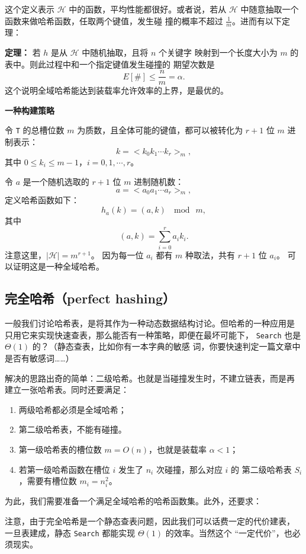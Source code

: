 \documentclass[a4paper]{ctexart}
\theoremstyle{definition}
\theoremstyle{definition}
\begin{document}
这个定义表示 $\mathscr{H}$ 中的函数，平均性能都很好。或者说，若从
$\mathscr{H}$ 中随意抽取一个函数来做哈希函数，任取两个键值，发生碰
撞的概率不超过 $\frac{1}{m}$。进而有以下定理：

{\bf 定理：} 若 $h$ 是从 $\mathscr{H}$ 中随机抽取，且将 $n$ 个关键字
映射到一个长度大小为 $m$ 的表中。则此过程中和一个指定键值发生碰撞的
期望次数是
$$ E[\#] \leq \frac{n}{m} = \alpha.
$$
这个说明全域哈希能达到装载率允许效率的上界，是最优的。

{\bf 一种构建策略}

令 \verb|T| 的总槽位数 $m$ 为质数，且全体可能的键值，都可以被转化为 $r +
1$ 位 $m$ 进制表示：$$ k = <k_0 k_1 \cdots k_r>_m, $$其中 $0 \leq
k_i \leq m - 1$，$i = 0, 1, \cdots, r$。

令 $a$ 是一个随机选取的 $r + 1$ 位 $m$ 进制随机数：
$$
a = <a_0 a_1 \cdots a_r>_m,
$$
定义哈希函数如下：
$$
h_a(k) = (a, k)~\mod~m,
$$
其中
$$
(a, k) = \sum_{i = 0}^r a_i k_i.
$$
注意这里，$|\mathscr{H}| = m^{r+1}$。
因为每一位 $a_i$ 都有 $m$ 种取法，共有 $r + 1$ 位 $a_i$。
可以证明这是一种全域哈希。


\subsection{完全哈希（perfect hashing）}

一般我们讨论哈希表，是将其作为一种动态数据结构讨论。但哈希的一种应用是
只用它来实现快速查表，那么能否有一种策略，即便在最坏可能下，
\verb|Search| 也是 $\Theta(1)$ 的？（静态查表，比如你有一本字典的敏感
  词，你要快速判定一篇文章中是否有敏感词……）

解决的思路出奇的简单：二级哈希。也就是当碰撞发生时，不建立链表，而是再
建立一张哈希表。同时还要满足：

\begin{enumerate}
\item 两级哈希都必须是全域哈希；
\item 第二级哈希表，不能有碰撞。
\item 第一级哈希表的槽位数 $m = O(n)$，也就是装载率 $\alpha < 1$；
\item 若第一级哈希函数在槽位 $i$ 发生了 $n_i$ 次碰撞，那么对应 $i$ 的
  第二级哈希表 $S_i$，需要有槽位数 $m_i = n_i^2$。
\end{enumerate}

为此，我们需要准备一个满足全域哈希的哈希函数集。此外，还要求：

注意，由于完全哈希是一个静态查表问题，因此我们可以话费一定的代价建表，
一旦表建成，静态 \verb|Search| 都能实现 $\Theta(1)$ 的效率。当然这个
“一定代价”，也必须现实。
\end{document}
